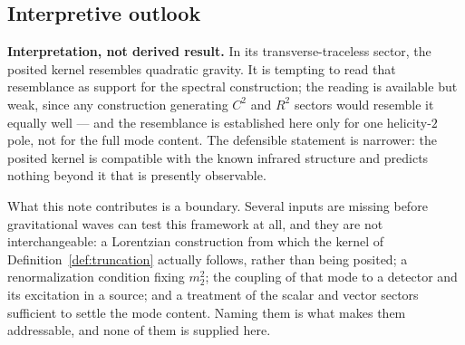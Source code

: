 \documentclass[12pt,a4paper]{article}
\theoremstyle{definition}
\begin{document}
    \subsection{Interpretive outlook}
      \label{subsec:outlook}

      \textbf{Interpretation, not derived result.}
      In its transverse-traceless sector, the posited kernel resembles quadratic gravity. It is tempting to read
      that resemblance as support for the spectral construction; the reading is available but weak, since any
      construction generating $C^2$ and $R^2$ sectors would resemble it equally well --- and the resemblance is
      established here only for one helicity-$2$ pole, not for the full mode content. The defensible statement is
      narrower: the posited kernel is compatible with the known infrared structure and predicts nothing beyond it
      that is presently observable.

      What this note contributes is a boundary. Several inputs are missing before gravitational waves can test
      this framework at all, and they are not interchangeable: a Lorentzian construction from which the kernel of
      Definition~\ref{def:truncation} actually follows, rather than being posited; a renormalization condition
      fixing $m_2^2$; the coupling of that mode to a detector and its excitation in a source; and a treatment of
      the scalar and vector sectors sufficient to settle the mode content. Naming them is what makes them
      addressable, and none of them is supplied here.

  
  
\end{document}

